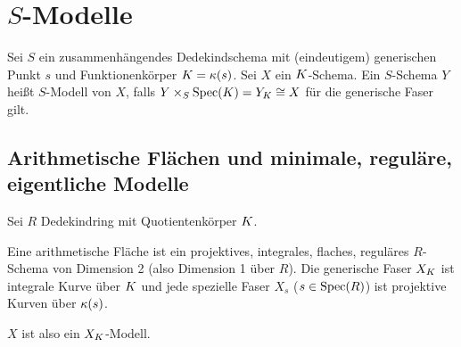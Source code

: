 \documentclass[german]{scrreprt}
\begin{document}

\chapter{$S$-Modelle}
\begin{Definition}[$S$-Modell]
  Sei $S$ ein zusammenhängendes Dedekindschema mit (eindeutigem)
  generischen Punkt $s$ und Funktionenkörper $K=\kappa(s)$.
  Sei $X$ ein $K$-Schema.
  Ein $S$-Schema $Y$ heißt $S$-Modell von $X$, falls
  $Y\times_S\operatorname{Spec}(K)=Y_K\cong X$ für die generische Faser gilt.
\end{Definition}


\section{Arithmetische Flächen und minimale, reguläre, eigentliche Modelle}
\begin{Definition}
  Sei $R$ Dedekindring mit Quotientenkörper $K$.

  
  Eine arithmetische Fläche ist ein projektives, integrales, flaches,
  reguläres $R$-Schema von Dimension 2 (also Dimension 1 über $R$).
  Die generische Faser $X_{K}$ ist integrale Kurve über $K$ und jede
  spezielle Faser $X_s$ ($s\in\operatorname{Spec}(R)$) ist projektive Kurven über
  $\kappa(s)$.
  
  $X$ ist also ein $X_{K}$-Modell.
\end{Definition}
\end{document}
